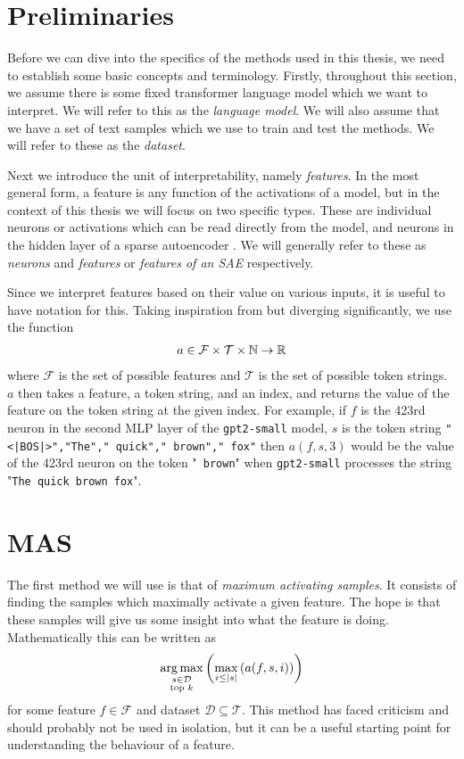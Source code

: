 \section{Preliminaries}
Before we can dive into the specifics of the methods used in this thesis, 
we need to establish some basic concepts and terminology.
Firstly, throughout this section, we assume there is some fixed 
transformer language model \parencite{vaswani_attention_2023} 
which we want to interpret.
We will refer to this as the \emph{language model}.
We will also assume that we have a set of text samples 
which we use to train and test the methods.
We will refer to these as the \emph{dataset}.

Next we introduce the unit of interpretability, namely \emph{features}. 
In the most general form, a feature is any function of the activations 
of a model, but in the context of this thesis we will focus on two 
specific types.
These are individual neurons or activations which can be read directly 
from the model, and neurons in the hidden layer of 
a sparse autoencoder \parencite{conmy_towards_2023}.
We will generally refer to these as \emph{neurons} and 
\emph{features} or \emph{features of an SAE} respectively.

Since we interpret features based on their value on various inputs, 
it is useful to have notation for this.
Taking inspiration from \cite{foote_neuron_2023} 
but diverging significantly, we use the function
\begin{align*}
    a\in\mathcal{F}\times\mathcal{T}\times\mathbb{N}\to\mathbb{R}
\end{align*} 
where $\mathcal{F}$ is the set of possible features and
$\mathcal{T}$ is the set of possible token strings.
$a$ then takes a feature, a token string, and an index, and returns 
the value of the feature on the token string at the given index.
For example, if $f$ is the 423rd neuron in the second MLP layer of 
the \verb|gpt2-small| model, $s$ is the token string 
\verb="<|BOS|>","The"," quick"," brown"," fox"=
then $a(f,s,3)$ would be the value of the 423rd neuron on the token 
"\verb| brown|" when \verb|gpt2-small| processes 
the string "\verb|The quick brown fox|".

\section{MAS}
The first method we will use is that of \emph{maximum activating samples}.
It consists of finding the samples which maximally activate a given feature.
The hope is that these samples will give us some insight 
into what the feature is doing.
Mathematically this can be written as
\begin{align*}
    \operatorname*{arg\,max}_{\substack{s\in\mathcal{D}\\ \text{top }k}}\left(\max_{i\leq|s|}\left(a(f,s,i)\right)\right)
\end{align*}
for some feature $f\in\mathcal{F}$ 
and dataset $\mathcal{D}\subseteq\mathcal{T}$.
This method has faced criticism \cite{bolukbasi_interpretability_2021} 
and should probably not be used in isolation, but it can be a useful
starting point for understanding the behaviour of a feature.

